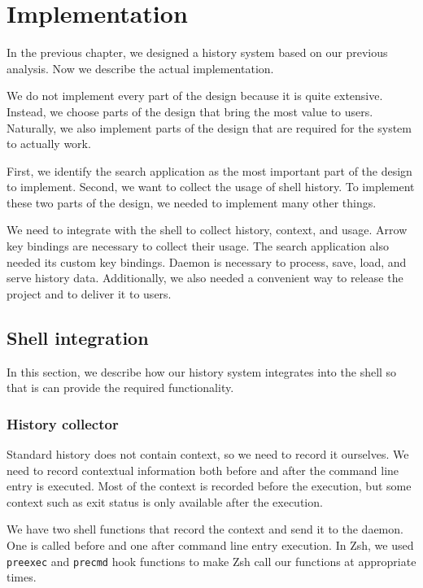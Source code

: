 
\chapter{Implementation}

In the previous chapter, we designed a history system based on our previous analysis. Now we describe the actual implementation. 

We do not implement every part of the design because it is quite extensive. Instead, we choose parts of the design that bring the most value to users. Naturally, we also implement parts of the design that are required for the system to actually work.

First, we identify the search application as the most important part of the design to implement. Second, we want to collect the usage of shell history. To implement these two parts of the design, we needed to implement many other things. 

We need to integrate with the shell to collect history, context, and usage. Arrow key bindings are necessary to collect their usage. The search application also needed its custom key bindings. Daemon is necessary to process, save, load, and serve history data. Additionally, we also needed a convenient way to release the project and to deliver it to users.

\section{Shell integration}

In this section, we describe how our history system integrates into the shell so that is can provide the required functionality. 

\subsection{History collector}

Standard history does not contain context, so we need to record it ourselves. 
We need to record contextual information both before and after the command line entry is executed. Most of the context is recorded before the execution, but some context such as exit status is only available after the execution. 

We have two shell functions that record the context and send it to the daemon. One is called before and one after command line entry execution. In Zsh, we used \verb|preexec| and \verb|precmd| hook functions to make Zsh call our functions at appropriate times. 

